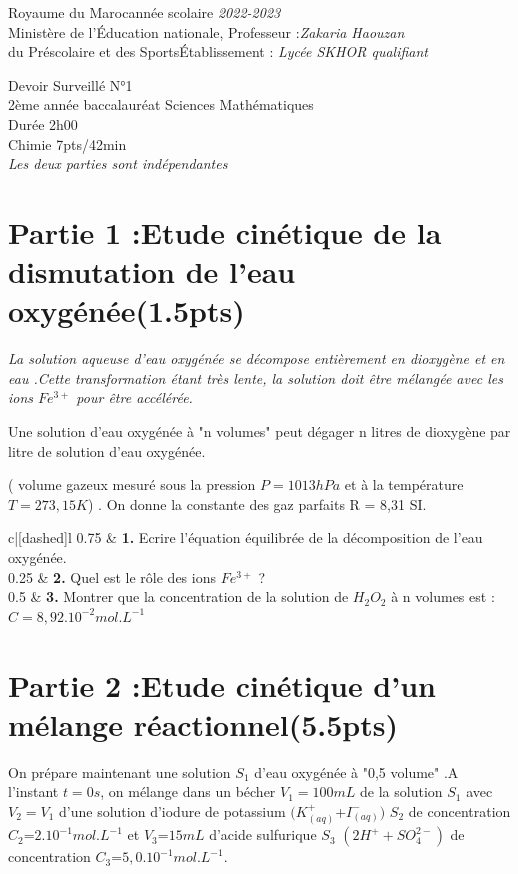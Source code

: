 \documentclass[12pt]{article}
\newcommand\headerMe[2]{\noindent{}#1\hfill#2}
\begin{document}
\headerMe{Royaume du Maroc}{année scolaire \emph{2022-2023}}\\
\headerMe{Ministère de l'Éducation nationale, }{  Professeur :\emph{Zakaria Haouzan}}\\
\headerMe{du Préscolaire et des Sports}{Établissement : \emph{Lycée SKHOR qualifiant}}\\

\begin{center}
Devoir Surveillé  N°1 \\
    2ème année baccalauréat Sciences Mathématiques\\
Durée 2h00
\\
    \vspace{.2cm}
\hrulefill
\Large{Chimie 7pts/42min}
\hrulefill\\

    \emph{Les deux parties sont indépendantes}
\end{center}

 \section*{Partie 1 :Etude cinétique de la dismutation de l'eau oxygénée\dotfill(1.5pts) }
 \emph{La solution aqueuse d’eau oxygénée se décompose entièrement en dioxygène et en eau .Cette
 transformation étant très lente, la solution doit être mélangée avec les ions $Fe^{3+}$ pour être accélérée.}

 Une solution d'eau oxygénée à "n volumes" peut dégager n litres de dioxygène par litre de solution d'eau oxygénée.

( volume gazeux mesuré sous la pression $P = 1013 hPa$ et à la température $T = 273,15 K$) . On donne la
constante des gaz parfaits R = 8,31 SI.


\begin{tblr}{c|[dashed]l}
	0.75  & \textbf{1. }Ecrire l’équation équilibrée de la décomposition de l’eau oxygénée.  \\
	0.25  & \textbf{2. }Quel est le rôle des ions $Fe^{3+}$ ?  \\
	0.5  & \textbf{3. }Montrer que la concentration de la solution de $H_2O_2$ à n volumes est : $C = 8,92.10^{-2}mol.L^{-1}$\\
\end{tblr}


 \section*{Partie 2 :Etude cinétique d’un mélange réactionnel\dotfill(5.5pts) }
 On prépare maintenant une solution $S_1$ d'eau oxygénée à "0,5 volume" .A l'instant $t = 0 s$, on mélange
 dans un bécher $V_1=100 mL$ de la solution $S_1$ avec $V_2=V_1$ d'une solution d'iodure de potassium $(K^+_{(aq)}$+$I^-_{(aq)})$ $S_2$ de
 concentration $C_2$=$2.10^{-1} mol.L^{-1}$ et $V_3$=$15 mL$ d'acide sulfurique $S_3$ $(2H^+ + SO_4^{2-})$ de concentration $C_3$=$5,0.10^{-1}mol.L^{-1}$.
\end{document}
